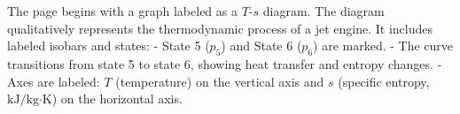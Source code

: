 The page begins with a graph labeled as a \( T \)-\( s \) diagram. The diagram qualitatively represents the thermodynamic process of a jet engine. It includes labeled isobars and states:  
- State 5 (\( p_5 \)) and State 6 (\( p_6 \)) are marked.  
- The curve transitions from state 5 to state 6, showing heat transfer and entropy changes.  
- Axes are labeled: \( T \) (temperature) on the vertical axis and \( s \) (specific entropy, \( \text{kJ/kg·K} \)) on the horizontal axis.